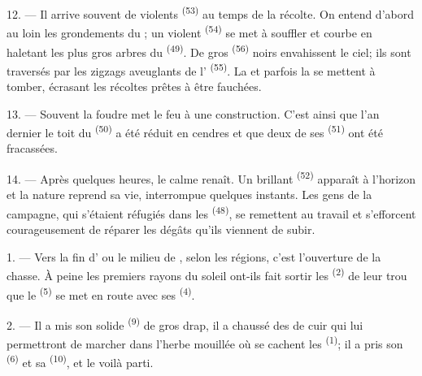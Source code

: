 12. --- Il arrive souvent de violents  \textsuperscript{(53)} au
temps de la récolte. On entend d'abord au loin les grondements du
; un violent  \textsuperscript{(54)} se
met à souffler et courbe en haletant les plus gros arbres du 
\textsuperscript{(49)}. De gros  \textsuperscript{(56)} noirs
envahissent le ciel; ils sont traversés par les zigzags aveuglants de
l' \textsuperscript{(55)}. La  et parfois la
 se mettent à tomber, écrasant les récoltes prêtes à être
fauchées.

13. --- Souvent la foudre met le feu à une construction. C'est ainsi que l'an
dernier le toit du  \textsuperscript{(50)} a été réduit en
cendres et que deux de ses  \textsuperscript{(51)} ont été
fracassées.

14. --- Après quelques heures, le calme renaît. Un brillant 
\textsuperscript{(52)} apparaît à l'horizon et la nature reprend sa vie,
interrompue quelques instants. Les gens de la campagne, qui s'étaient réfugiés
dans les  \textsuperscript{(48)}, se remettent au travail et
s'efforcent courageusement de réparer les dégâts qu'ils viennent de subir.

\VUsaut{6.0mm}
\VUsaut{3.6mm}

\VUsaut{1.4mm}
\VUsaut{4.0mm}

1. --- Vers la fin d' ou le milieu de , selon les
régions, c'est l'ouverture de la chasse. À peine les premiers rayons du soleil
ont-ils fait sortir les  \textsuperscript{(2)} de leur trou que
le  \textsuperscript{(5)} se met en route avec ses
 \textsuperscript{(4)}.

2. --- Il a mis son solide  \textsuperscript{(9)} de
gros drap, il a chaussé des  de cuir qui lui permettront de
marcher dans l'herbe mouillée où se cachent les 
\textsuperscript{(1)}; il a pris son  \textsuperscript{(6)} et sa
 \textsuperscript{(10)}, et le voilà parti.

